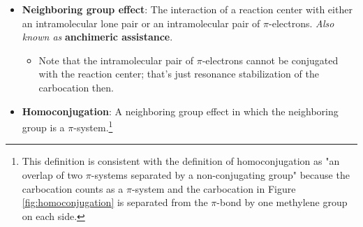 \documentclass[../notes.tex]{subfiles}
\begin{document}
\begin{itemize}
\begin{itemize}
\begin{itemize}
            \item If S\textsubscript{N}1: We'll see 50\% \emph{syn} and 50\% \emph{anti}, maybe favoring \emph{anti} a bit due to sterics.
            \begin{itemize}
                \item Both diastereomers will be enantipure (we're not engaging the acetate's chiral carbon).
            \end{itemize}
            \item Observed: We get 0\% \emph{syn} and 100\% \emph{anti}, and it's a racemic mixture of the \emph{anti} diastereomer.
        \end{itemize}
        \item What's happening here?!
        \begin{itemize}
            \item The acyl group is not as innocent as it seems.
            \item Per Figure \ref{fig:neighborb}, the actual mechanism begins with intramolecular displacement of the bromine to form a resonance-stabilized carbocation. This is followed by a backside attack on \emph{either} carbon, hence selecting the \emph{anti} product and inducing the racemization.
            \item Conclusion: The neighboring group effect makes this reaction \emph{trans}-selective and racemizing.
        \end{itemize}
    \end{itemize}
    \item \textbf{Neighboring group effect}: The interaction of a reaction center with either an intramolecular lone pair or an intramolecular pair of $\pi$-electrons. \emph{Also known as} \textbf{anchimeric assistance}.
    \begin{itemize}
        \item Note that the intramolecular pair of $\pi$-electrons cannot be conjugated with the reaction center; that's just resonance stabilization of the carbocation then.
    \end{itemize}
    \item \textbf{Homoconjugation}: A neighboring group effect in which the neighboring group is a $\pi$-system.\footnote{This definition is consistent with the definition of homoconjugation as "an overlap of two $\pi$-systems separated by a non-conjugating group" because the carbocation counts as a $\pi$-system and the carbocation in Figure \ref{fig:homoconjugation} is separated from the $\pi$-bond by one methylene group on each side.}

\end{itemize}
\end{document}

